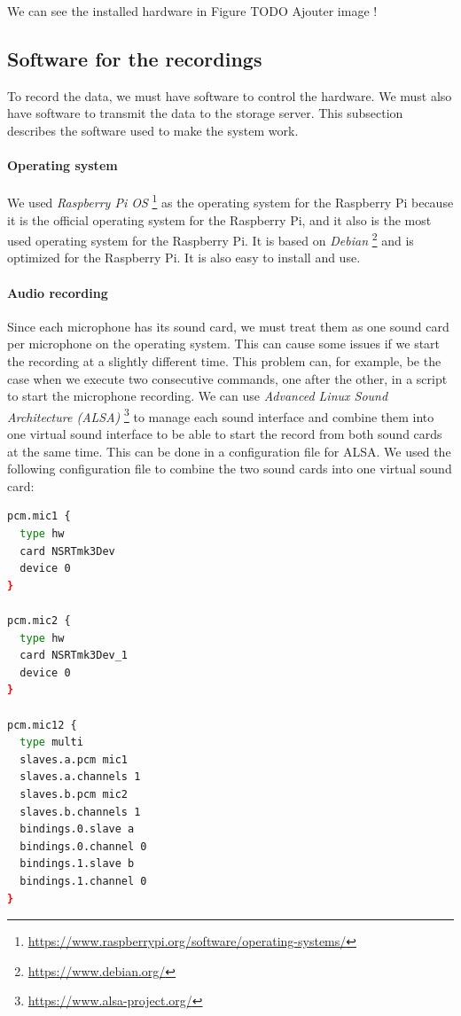 We can see the installed hardware in Figure TODO Ajouter image !

\subsection{Software for the recordings}

To record the data, we must have software to control the hardware. We must also have software to transmit the data to the storage server. This subsection describes the software used to make the system work.

\paragraph{Operating system}

We used \textit{Raspberry Pi OS} \footnote{\url{https://www.raspberrypi.org/software/operating-systems/}} as the operating system for the Raspberry Pi because it is the official operating system for the Raspberry Pi, and it also is the most used operating system for the Raspberry Pi. It is based on \textit{Debian} \footnote{\url{https://www.debian.org/}} and is optimized for the Raspberry Pi. It is also easy to install and use.

\paragraph{Audio recording}

Since each microphone has its sound card, we must treat them as one sound card per microphone on the operating system. This can cause some issues if we start the recording at a slightly different time. This problem can, for example, be the case when we execute two consecutive commands, one after the other, in a script to start the microphone recording. We can use \textit{Advanced Linux Sound Architecture (ALSA)} \footnote{\url{https://www.alsa-project.org/}} to manage each sound interface and combine them into one virtual sound interface to be able to start the record from both sound cards at the same time. This can be done in a configuration file for ALSA. We used the following configuration file to combine the two sound cards into one virtual sound card:

\begin{lstlisting}[language=bash]
pcm.mic1 {
  type hw
  card NSRTmk3Dev
  device 0
}

pcm.mic2 {
  type hw
  card NSRTmk3Dev_1
  device 0
}

pcm.mic12 {
  type multi
  slaves.a.pcm mic1
  slaves.a.channels 1
  slaves.b.pcm mic2
  slaves.b.channels 1
  bindings.0.slave a
  bindings.0.channel 0
  bindings.1.slave b
  bindings.1.channel 0
}
\end{lstlisting}

